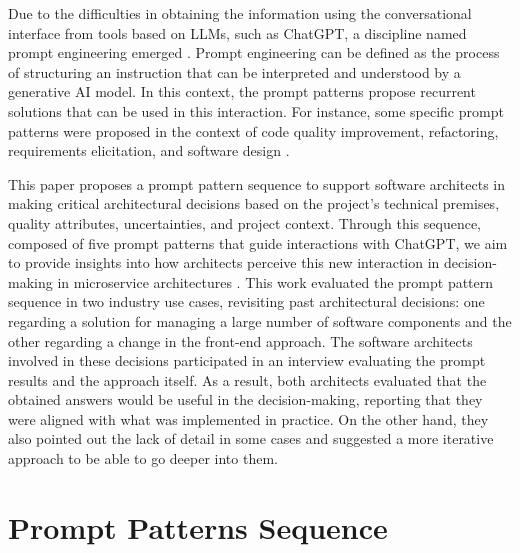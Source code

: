 \documentclass[runningheads]{llncs}
\begin{document}
Due to the difficulties in obtaining the information using the conversational interface from tools based on LLMs, such as ChatGPT, a discipline named prompt engineering emerged \cite{Phoenix2024}. Prompt engineering can be defined as the process of structuring an instruction that can be interpreted and understood by a generative AI model. In this context, the prompt patterns \cite{white2023prompt} propose recurrent solutions that can be used in this interaction. For instance, some specific prompt patterns were proposed in the context of code quality improvement, refactoring, requirements elicitation, and software design \cite{white2024chatgpt}.

This paper proposes a prompt pattern sequence to support software architects in making critical architectural decisions based on the project's technical premises, quality attributes, uncertainties, and project context. Through this sequence, composed of five prompt patterns that guide interactions with ChatGPT, we aim to provide insights into how architects perceive this new interaction in decision-making in microservice architectures \cite{ayas2021,zdun2018}. This work evaluated the prompt pattern sequence in two industry use cases, revisiting past architectural decisions: one regarding a solution for managing a large number of software components and the other regarding a change in the front-end approach. The software architects involved in these decisions participated in an interview evaluating the prompt results and the approach itself. As a result, both architects evaluated that the obtained answers would be useful in the decision-making, reporting that they were aligned with what was implemented in practice. On the other hand, they also pointed out the lack of detail in some cases and suggested a more iterative approach to be able to go deeper into them.


\section{Prompt Patterns Sequence}\label{prompt-patterns-sequence}
\end{document}

